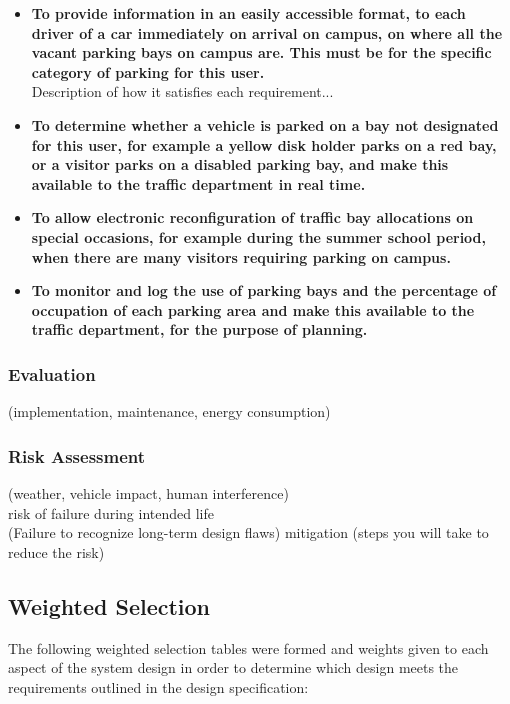 \begin{itemize}
\item \textbf{To provide information in an easily accessible format, to each driver of a car immediately on arrival on campus, on where all the vacant parking bays on campus are. This must be for the specific category of parking for this user.}\\
Description of how it satisfies each requirement...

\item \textbf{To determine whether a vehicle is parked on a bay not designated for this user, for example a yellow disk holder parks on a red bay, or a visitor parks on a disabled parking bay, and make this available to the traffic department in real time.}\\

\item \textbf{To allow electronic reconfiguration  of  traffic  bay allocations on special occasions, for example during the summer school period, when there are many visitors requiring parking on campus.}\\

\item \textbf{To monitor and log the use of parking bays and the percentage of occupation of each parking area and make this available to the traffic department, for the purpose of planning.}\\
\end{itemize}

\subsubsection{Evaluation}
(implementation, maintenance, energy consumption) \\

\subsubsection{Risk Assessment}
(weather, vehicle impact, human interference) \\
risk of failure during intended life \\
(Failure to recognize long-term design flaws)
mitigation (steps you will take to reduce the risk) \\

\newpage
\subsection{Weighted Selection}
The following weighted selection tables were formed and weights given to each aspect of the system design in order to determine which design meets the requirements outlined in the design specification:

